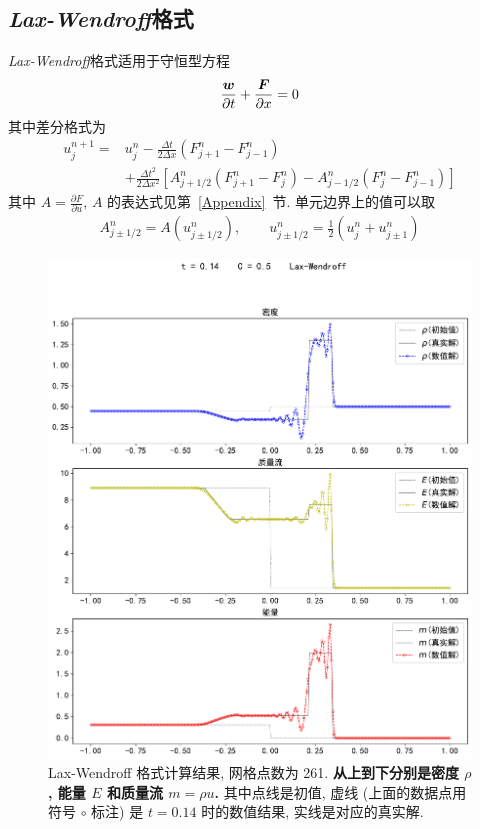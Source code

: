 \documentclass[10.5pt
]{article}
\begin{document}
\subsection{\textit{Lax-Wendroff}格式}
\textit{Lax-Wendroff}格式适用于守恒型方程
\begin{align}
\frac{\vb*w}{\partial t} + \frac{\vb*F}{\partial x} = 0
\end{align}
其中差分格式为
\begin{align}
u_j^{n+1} =& u_j^n - \frac{\Delta t}{2\Delta x} (F_{j+1}^n - F_{j-1}^n) \nonumber\\
& + \frac{\Delta t^2}{2\Delta x^2} \left[A_{j+1/2}^n (F_{j+1}^n-F_j^n) - A_{j-1/2}^n (F_j^n -
F_{j-1}^n)\right]
\end{align}
其中 $A = \frac{\partial F}{\partial u}$, $A$ 的表达式见第~\ref{Appendix}~节. 单元边界上的值可以取
\begin{align}
A_{j \pm 1/2}^n = A(u_{j \pm 1/2}^n), \qquad u_{j \pm 1/2}^n = \frac{1}{2} (u_j^n + u_{j \pm 1}^n)
\end{align}
\begin{figure}
\begin{center}
\includegraphics[width=.85\textwidth]{figures/lax_wendroff261.pdf}
\caption{Lax-Wendroff 格式计算结果, 网格点数为 261. \textbf{从上到下分别是密度 $\rho$, 能量 $E$ 和质量流 $m = \rho u$.}
其中点线是初值, 虚线 (上面的数据点用符号 $\circ$ 标注) 是 $t=0.14$ 时的数值结果, 实线是对应的真实解.}\label{Fig:Upwind}
\end{center}
\end{figure}
\end{document}
